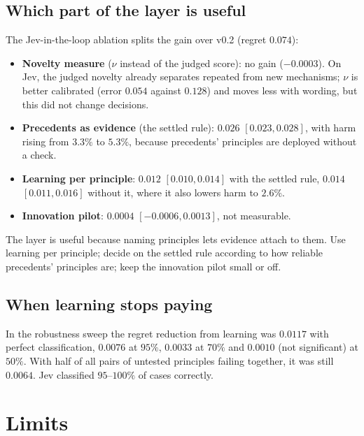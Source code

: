 \documentclass[11pt]{article}
\begin{document}
\subsection*{Which part of the layer is useful}
The Jev-in-the-loop ablation splits the gain over v0.2 (regret $0.074$):
\begin{itemize}
\item \textbf{Novelty measure} ($\nu$ instead of the judged score): no gain ($-0.0003$). On Jev, the
judged novelty already separates repeated from new mechanisms; $\nu$ is better calibrated (error
$0.054$ against $0.128$) and moves less with wording, but this did not change decisions.
\item \textbf{Precedents as evidence} (the settled rule): $0.026$ $[0.023,0.028]$, with harm rising
from $3.3\%$ to $5.3\%$, because precedents' principles are deployed without a check.
\item \textbf{Learning per principle}: $0.012$ $[0.010,0.014]$ with the settled rule, $0.014$
$[0.011,0.016]$ without it, where it also lowers harm to $2.6\%$.
\item \textbf{Innovation pilot}: $0.0004$ $[-0.0006,0.0013]$, not measurable.
\end{itemize}
The layer is useful because naming principles lets evidence attach to them. Use learning per
principle; decide on the settled rule according to how reliable precedents' principles are; keep
the innovation pilot small or off.

\subsection*{When learning stops paying}
In the robustness sweep the regret reduction from learning was $0.0117$ with perfect classification,
$0.0076$ at $95\%$, $0.0033$ at $70\%$ and $0.0010$ (not significant) at $50\%$. With half of all
pairs of untested principles failing together, it was still $0.0064$. Jev classified $95$--$100\%$ of
cases correctly.

\section{Limits}
\end{document}
